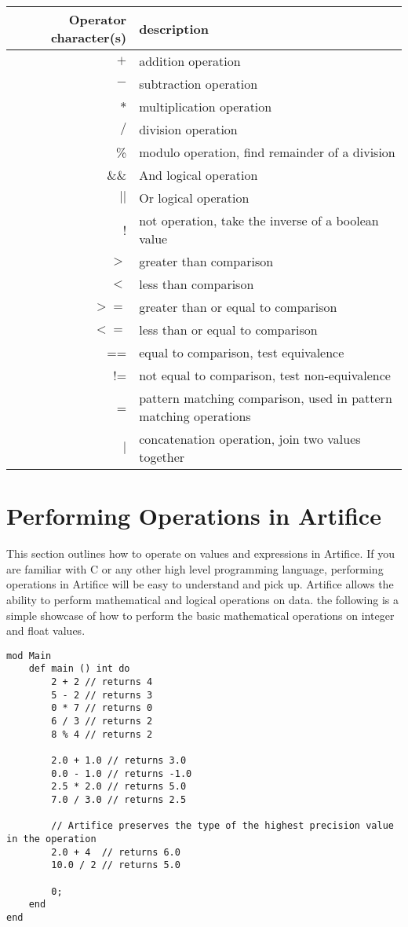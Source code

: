 \documentclass{article}
\begin{document}
\begin{center}
\begin{tabular}{|r|l|}
\hline
Operator character(s) & description \\
\hline
\hline
$+$ & addition operation \\
$-$ & subtraction operation \\
$*$ & multiplication operation \\
$/$ & division operation \\
\% & modulo operation, find remainder of a division \\
\hline
\hline
\&\& & And logical operation \\
$||$ & Or logical operation \\
! & not operation, take the inverse of a boolean value \\
\hline
$>$ & greater than comparison \\
$<$ & less than comparison \\
$>=$ & greater than or equal to comparison \\
$<=$ & less than or equal to comparison \\
== & equal to comparison, test equivalence \\
!= & not equal to comparison, test non-equivalence \\
~= & pattern matching comparison, used in pattern matching operations \\
\hline
\hline
$|$ & concatenation operation, join two values together \\
\hline
\end{tabular}
\end{center}


\section{Performing Operations in Artifice}

This section outlines how to operate on values and expressions in Artifice. If you are familiar with C or any other high level programming language, performing 
operations in Artifice will be easy to understand and pick up. Artifice allows the ability to perform mathematical and logical operations on data. the following is a
simple showcase of how to perform the basic mathematical operations on integer and float values.

\begin{lstlisting}
mod Main
	def main () int do
		2 + 2 // returns 4
		5 - 2 // returns 3
		0 * 7 // returns 0
		6 / 3 // returns 2
		8 % 4 // returns 2

		2.0 + 1.0 // returns 3.0
		0.0 - 1.0 // returns -1.0
		2.5 * 2.0 // returns 5.0
		7.0 / 3.0 // returns 2.5

		// Artifice preserves the type of the highest precision value in the operation
		2.0 + 4  // returns 6.0
		10.0 / 2 // returns 5.0

		0;
	end
end
\end{lstlisting}
\end{document}
